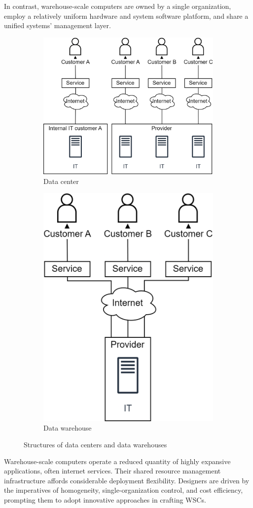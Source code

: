 In contrast, warehouse-scale computers are owned by a single organization, employ a relatively uniform hardware and system software platform, and share a unified systems' management layer.
\begin{figure}[H]
    \centering
    \begin{subfigure}{0.49\textwidth}
        \centering
        \includegraphics[width=0.75\linewidth]{images/datacenter.png} 
        \caption{Data center}
    \end{subfigure}
    \begin{subfigure}{0.49\textwidth}
        \centering
        \includegraphics[width=0.45\linewidth]{images/warehouse.png}
        \caption{Data warehouse}
    \end{subfigure}
    \caption{Structures of data centers and data warehouses}
\end{figure}
Warehouse-scale computers operate a reduced quantity of highly expansive applications, often internet services.
Their shared resource management infrastructure affords considerable deployment flexibility. 
Designers are driven by the imperatives of homogeneity, single-organization control, and cost efficiency, prompting them to adopt innovative approaches in crafting WSCs.

